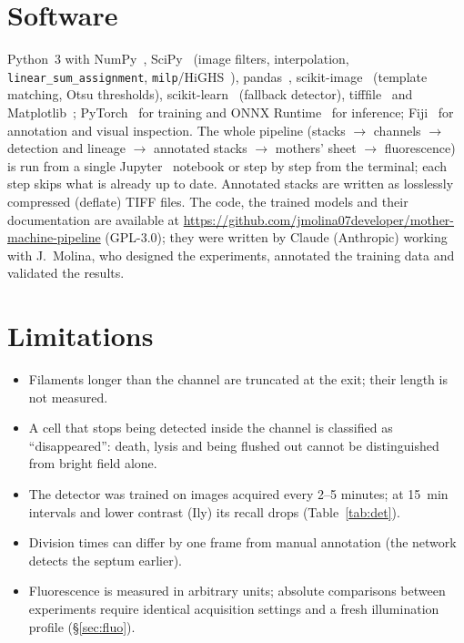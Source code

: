 \documentclass[11pt,a4paper]{article}
\begin{document}
\section{Software}
Python~3 with NumPy~\cite{harris2020}, SciPy~\cite{virtanen2020} (image filters, interpolation, \texttt{linear\_sum\_assignment}, \texttt{milp}/HiGHS~\cite{huangfu2018}), pandas~\cite{mckinney2010}, scikit-image~\cite{vanderwalt2014} (template matching, Otsu thresholds), scikit-learn~\cite{pedregosa2011} (fallback detector), tifffile~\cite{tifffile} and Matplotlib~\cite{hunter2007}; PyTorch~\cite{paszke2019} for training and ONNX Runtime~\cite{onnxruntime} for inference; Fiji~\cite{schindelin2012} for annotation and visual inspection. The whole pipeline (stacks $\to$ channels $\to$ detection and lineage $\to$ annotated stacks $\to$ mothers' sheet $\to$ fluorescence) is run from a single Jupyter~\cite{kluyver2016} notebook or step by step from the terminal; each step skips what is already up to date. Annotated stacks are written as losslessly compressed (deflate) TIFF files. The code, the trained models and their documentation are available at \url{https://github.com/jmolina07developer/mother-machine-pipeline} (GPL-3.0); they were written by Claude (Anthropic) working with J.~Molina, who designed the experiments, annotated the training data and validated the results.

\section{Limitations}
\begin{itemize}
\item Filaments longer than the channel are truncated at the exit; their length is not measured.
\item A cell that stops being detected inside the channel is classified as ``disappeared'': death, lysis and being flushed out cannot be distinguished from bright field alone.
\item The detector was trained on images acquired every 2--5 minutes; at \SI{15}{\minute} intervals and lower contrast (Ily) its recall drops (Table~\ref{tab:det}).
\item Division times can differ by one frame from manual annotation (the network detects the septum earlier).
\item Fluorescence is measured in arbitrary units; absolute comparisons between experiments require identical acquisition settings and a fresh illumination profile (\S\ref{sec:fluo}).
\end{itemize}
\end{document}
